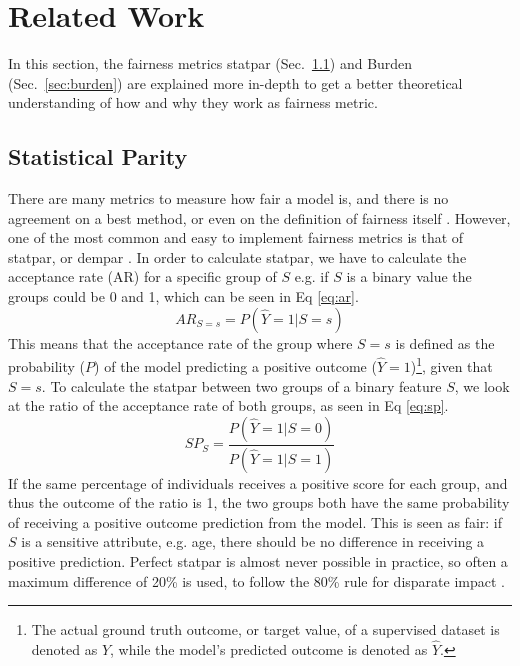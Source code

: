 \documentclass[runningheads]{llncs}
\begin{document}
\section{Related Work}\label{sec:relatedwork}

In this section, the fairness metrics \gls{statpar} (Sec.~\ref{sec:sp}) and
\gls{Burden} (Sec.~\ref{sec:burden}) are explained more in-depth to get a
better theoretical understanding of how and why they work as fairness metric.

\subsection{Statistical Parity}\label{sec:sp}
There are many metrics to measure how fair a model is, and there is no
agreement on a best method, or even on the definition of fairness itself
\cite{chouldechova2018frontiers}. However, one of the most common and easy to
implement fairness metrics is that of \gls{statpar}, or \gls{dempar}
\cite{kamiran2009demographicparity}. In order to calculate \gls{statpar}, we
have to calculate the acceptance rate (AR) for a specific group of $S$ e.g. if
$S$ is a binary value the groups could be 0 and 1, which can be seen in Eq
\ref{eq:ar}.
\begin{equation}\label{eq:ar}
 AR_{S=s} = P(\hat{Y}=1|S=s)
\end{equation}
This means that the acceptance rate of the group where $S=s$ is defined as the
probability ($P$) of the model predicting a positive outcome
($\hat{Y}=1$)\footnote{The actual ground truth outcome, or target value, of a
supervised dataset is denoted as $Y$, while the model's predicted outcome is
denoted as $\hat{Y}$.}, given that $S=s$. To calculate the \gls{statpar}
between two groups of a binary feature $S$, we look at the ratio of the
acceptance rate of both groups, as seen in Eq \ref{eq:sp}.
\begin{equation}\label{eq:sp}
    SP_{S} = \frac{P(\hat{Y}=1|S=0)}{P(\hat{Y}=1|S=1)}
\end{equation}
If the same percentage of individuals receives a positive score for each group,
and thus the outcome of the ratio is 1, the two groups both have the same
probability of receiving a positive outcome prediction from the model. This is
seen as fair: if $S$ is a sensitive attribute, e.g. age, there should be no
difference in receiving a positive prediction. Perfect \gls{statpar} is almost
never possible in practice, so often a maximum difference of 20\% is used, to
follow the 80\% rule for disparate impact \cite{feldman2015certifying}.
\end{document}
